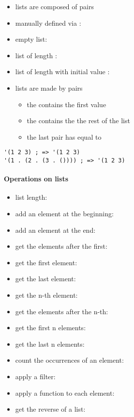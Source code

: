 \documentclass[a4paper,landscape,10pt]{article}
\begin{document}
\begin{multicols*}{2}
  \begin{itemize}
    \item lists are composed of pairs
    \item manually defined via : 
    \item empty list: 
    \item list of length : 
    \item list of length  with initial value : 
    \item lists are made by pairs
          \begin{itemize} \item the  contains the first value
            \item the  contains the the rest of the list
            \item the last pair has  equal to 
          \end{itemize}
  \end{itemize}

  \begin{lstlisting}[language=Racket]
'(1 2 3) ; => '(1 2 3)
'(1 . (2 . (3 . ()))) ; => '(1 2 3)
\end{lstlisting}

  \paragraph{Operations on lists}

  \begin{itemize}
    \item list length: 
    \item add an element at the beginning: 
    \item add an element at the end: 
    \item get the elements after the first: 
    \item get the first element: 
    \item get the last element: 
    \item get the n-th element: 
    \item get the elements after the n-th: 
    \item get the first n elements: 
    \item get the last n elements: 
    \item count the occurrences of an element: 
    \item apply a filter: 
    \item apply a function to each element: 
    \item get the reverse of a list: 
  \end{itemize}


\end{multicols*}
\end{document}
